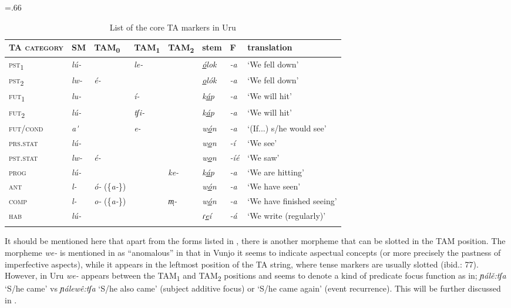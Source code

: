 \documentclass[output=paper]{langscibook}
\begin{document}
\begin{table}
\small\tabcolsep=.66\tabcolsep
\begin{tabularx}{\textwidth}{>{\scshape}lllllllQ}
\lsptoprule
{\normalfont TA category} & SM & {TAM\textsubscript{0}} & {TAM\textsubscript{1}} & {TAM\textsubscript{2}} & stem & F & translation\\
\midrule
pst\textsubscript{1}   & {\itshape lú-} &  & {\itshape le-} &  & {\textit{\ul{ó}lok}} & {\itshape {}-a} & `We fell down'\\
pst\textsubscript{2}   & {\itshape lw-} & {\itshape é-} &  &  & {\textit{\ul{o}lók}} & {\itshape {}-a} & `We fell down'\\
fut\textsubscript{1}   & {\itshape lu-} &  & {\itshape í-} &  & {\textit{k\ul{á}p}} & {\itshape {}-a} & `We will hit'\\
fut\textsubscript{2}   & {\itshape lú-} &  & {\itshape tʃi-} &  & {\textit{k\ul{á}p}} & {\itshape {}-a} & `We will hit'\\
fut/cond               & {\textit{a\'{} }} &  & {\itshape e-} &  & {\textit{w\ul{ó}n}} & {\itshape {}-a} & `(If...) s/he would see'\\
prs.stat               & {\itshape lú-} &  &  &  & {\textit{w\ul{o}n}} & {\itshape {}-í} & `We see'\\
pst.stat               & {\itshape lw-} & {\itshape é-} &  &  & {\textit{w\ul{o}n}} & {\itshape {}-íé} & `We saw'\\
prog                   & {\itshape lú-} &  &  & {\itshape ke-} & {\textit{k\ul{á}p}} & {\itshape {}-a} & `We are hitting'\\
ant                    & {\itshape l-} & {\textit{ó-} (\{\textit{a-}\})} &  &  & {\textit{w\ul{ó}n}} & {\itshape {}-a} & `We have seen' \\
comp                   & {\itshape l-} & {\textit{o-} (\{\textit{a-}\})} &  & {\itshape m̩-} & {\textit{w\ul{ó}n}} & {\itshape {}-a} & `We have finished seeing' \\
hab                    & {\itshape lú-} &  &  &  & { \textit{ɾ\ul{e}í}} & {\itshape {}-á} & `We write (regularly)' \\
\lspbottomrule
\end{tabularx}
\caption{List of the core TA markers in Uru}
\label{tab:shinagawa:3}
\end{table}

It should be mentioned here that apart from the forms listed in , there is another morpheme that can be slotted in the TAM position. The morpheme \textit{we-} is mentioned in \citet{Nurse2003a} as ``anomalous'' in that in Vunjo it seems to indicate aspectual concepts (or more precisely the pastness of imperfective aspects), while it appears in the leftmost position of the TA string, where tense markers are usually slotted (ibid.: 77). However, in Uru \textit{we-} appears between the TAM\textsubscript{1} and TAM\textsubscript{2} positions and seems to denote a kind of predicate focus function as in; \textit{ɲálě:tʃa} ‘S/he came’ vs \textit{ɲálewê:tʃa} ‘S/he also came’ (subject additive focus) or ‘S/he came again’ (event recurrence). This will be further discussed in .
\end{document}
